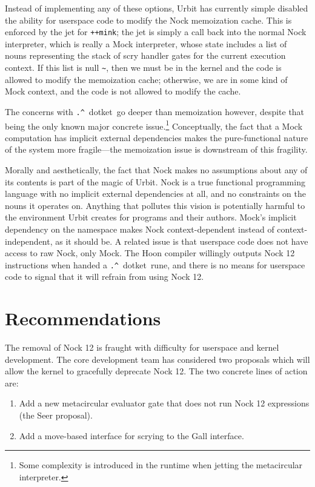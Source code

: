 \documentclass[twoside]{article}
\newcommand{\dotket}{\lstinline[style=inlinecode]{.^}~dotket}
\begin{document}
\noindent
Instead of implementing any of these options, Urbit has currently simple disabled the ability for userspace code to modify the Nock memoization cache.  This is enforced by the jet for \lstinline[style=inlinecode]{++mink}; the jet is simply a call back into the normal Nock interpreter, which is really a Mock interpreter, whose state includes a list of nouns representing the stack of scry handler gates for the current execution context.  If this list is null \lstinline[style=inlinecode]{~}, then we must be in the kernel and the code is allowed to modify the memoization cache; otherwise, we are in some kind of Mock context, and the code is not allowed to modify the cache.

The concerns with \dotket~go deeper than memoization however, despite that being the only known major concrete issue.\footnote{Some complexity is introduced in the runtime when jetting the metacircular interpreter.}  Conceptually, the fact that a Mock computation has implicit external dependencies makes the pure-functional nature of the system more fragile—the memoization issue is downstream of this fragility.

Morally and aesthetically, the fact that Nock makes no assumptions about any of its contents is part of the magic of Urbit.  Nock is a true functional programming language with no implicit external dependencies at all, and no constraints on the nouns it operates on.  Anything that pollutes this vision is potentially harmful to the environment Urbit creates for programs and their authors.  Mock's implicit dependency on the namespace makes Nock context-dependent instead of context-independent, as it should be.  A related issue is that userspace code does not have access to raw Nock, only Mock.  The Hoon compiler willingly outputs Nock 12 instructions when handed a \dotket~rune, and there is no means for userspace code to signal that it will refrain from using Nock 12.


\section{Recommendations}

The removal of Nock 12 is fraught with difficulty for userspace and kernel development.  The core development team has considered two proposals which will allow the kernel to gracefully deprecate Nock 12.  The two concrete lines of action are:

\begin{enumerate}
  \item  Add a new metacircular evaluator gate that does not run Nock 12 expressions (the Seer proposal).
  \item  Add a move-based interface for scrying to the Gall interface.
\end{enumerate}
\end{document}
